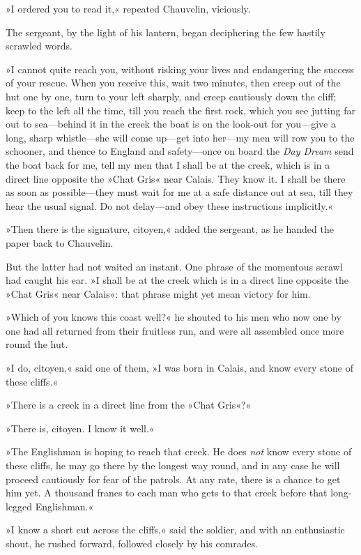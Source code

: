»I ordered you to read it,« repeated Chauvelin, viciously.

The sergeant, by the light of his lantern, began deciphering the few hastily scrawled words.

»I cannot quite reach you, without risking your lives and endangering the success of your rescue. When you receive this, wait two minutes, then creep out of the hut one by one, turn to your left sharply, and creep cautiously down the cliff; keep to the left all the time, till you reach the first rock, which you see jutting far out to sea—behind it in the creek the boat is on the look-out for you—give a long, sharp whistle—she will come up—get into her—my men will row you to the schooner, and thence to England and safety—once on board the \textit{Day Dream} send the boat back for me, tell my men that I shall be at the creek, which is in a direct line opposite the »Chat Gris« near Calais. They know it. I shall be there as soon as possible—they must wait for me at a safe distance out at sea, till they hear the usual signal. Do not delay—and obey these instructions implicitly.«

»Then there is the signature, citoyen,« added the sergeant, as he handed the paper back to Chauvelin.

But the latter had not waited an instant. One phrase of the momentous scrawl had caught his ear. »I shall be at the creek which is in a direct line opposite the »Chat Gris« near Calais«: that phrase might yet mean victory for him.

»Which of you knows this coast well?« he shouted to his men who now one by one had all returned from their fruitless run, and were all assembled once more round the hut.

»I do, citoyen,« said one of them, »I was born in Calais, and know every stone of these cliffs.«

»There is a creek in a direct line from the »Chat Gris«?«

»There is, citoyen. I know it well.«

»The Englishman is hoping to reach that creek. He does \textit{not} know every stone of these cliffs, he may go there by the longest way round, and in any case he will proceed cautiously for fear of the patrols. At any rate, there is a chance to get him yet. A thousand francs to each man who gets to that creek before that long-legged Englishman.«

»I know a short cut across the cliffs,« said the soldier, and with an enthusiastic shout, he rushed forward, followed closely by his comrades.

